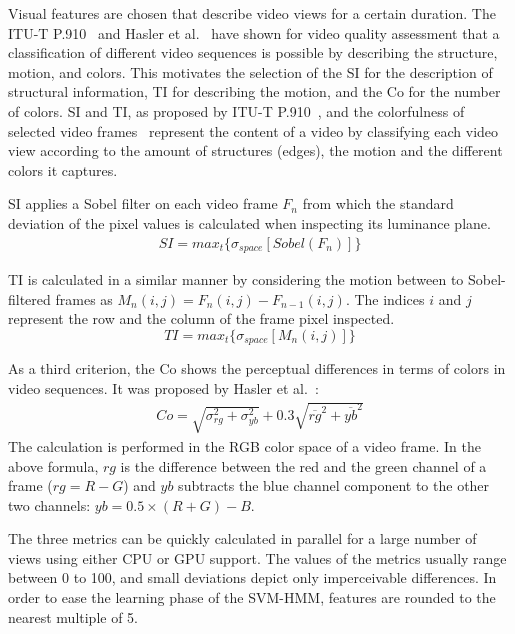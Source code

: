 Visual features are chosen that describe video views for a certain duration.
The \ac{ITU}-T P.910~\cite{ITU-J2008} and Hasler et al.~\cite{Hasler2003} have shown for video quality assessment that a classification of different video sequences is possible by describing the structure, motion, and colors.
This motivates the selection of the \ac{SI} for the description of structural information, \ac{TI} for describing the motion, and the \ac{Co} for the number of colors.
\ac{SI} and \ac{TI}, as proposed by \ac{ITU}-T P.910~\cite{ITU-J2008}, and the colorfulness of selected video frames~\cite{Hasler2003} represent the content of a video by classifying each video view according to the amount of structures (edges), the motion and the different colors it captures.

\ac{SI} applies a Sobel filter on each video frame $F_n$ from which the standard deviation of the pixel values is calculated when inspecting its luminance plane.
\begin{equation}
\begin{split}
SI = max_{t}\{{\sigma_{space}[Sobel(F_{n})]}\}
\end{split}
\end{equation}

\ac{TI} is calculated in a similar manner by considering the motion between to Sobel-filtered frames as  $M_n(i,j) = F_n (i,j) - F_{n-1}(i,j)$.  
The indices $i$ and $j$ represent the row and the column of the frame pixel inspected. 
\begin{equation}
TI = max_{t}\{{\sigma_{space}[M_n(i, j)]}\}\end{equation} 

As a third criterion, the \ac{Co} shows the perceptual differences in terms of colors in video sequences. 
It was proposed by Hasler et al.~\cite{Hasler2003}:
\begin{equation}
\begin{split}
Co = \sqrt{\sigma_{rg}^2+\sigma_{yb}^2} + 0.3 \sqrt{\overline{rg}^2+\overline{yb}^2}
\end{split}
\end{equation} 
The calculation is  performed in the \ac{RGB} color space of a video frame.
In the above formula, $rg$ is the difference between the red and the green channel of a frame ($rg = R-G$) and $yb$ subtracts the blue channel component to the other two channels: $yb = 0.5 \times (R+G)-B$. 

The three metrics can be quickly calculated in parallel for a large number of views using either \ac{CPU} or \ac{GPU} support.
The values of the metrics usually range between 0 to 100, and small deviations depict only imperceivable differences.
In order to ease the learning phase of the \ac{SVM-HMM}, features are rounded to the nearest multiple of 5.


